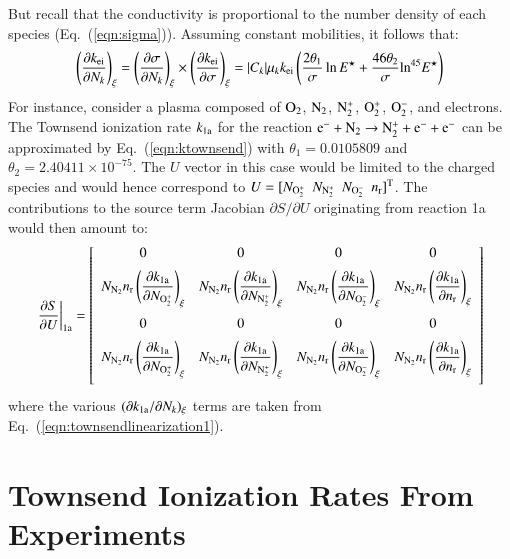 \documentclass{warpdoc}
\newcommand{\alb}{\vspace{0.2cm}\\} %
\newcommand{\nr}{{{n}_{\rm r}}}
\newcommand{\mfd}{\displaystyle}
\begin{document}
%
But recall that the conductivity is proportional to the number density of each species (Eq.\ (\ref{eqn:sigma})). Assuming constant mobilities, it follows that:
%
\begin{equation}
 \left(\frac{\partial k_{\rm ei}}{\partial N_k}\right)_\xi=\left(\frac{\partial \sigma}{\partial N_k}\right)_\xi \times \left(\frac{\partial k_{\rm ei}}{\partial \sigma}\right)_\xi = |C_k| \mu_k k_{\rm ei} \left(\frac{2\theta_1}{\sigma}\ln E^\star + \frac{46 \theta_2}{\sigma} {\rm ln}^{45}E^\star \right) 
\label{eqn:townsendlinearization1}
\end{equation}
%
For instance, consider a plasma composed of $\rm O_2$, $\rm N_2$, $\rm N_2^+$, $\rm O_2^+$, $\rm O_2^-$, and electrons. The Townsend ionization rate $k_{\rm 1a}$ for the reaction $\rm e^-+N_2 \rightarrow N_2^++e^-+e^-$ can be approximated by Eq.\ (\ref{eqn:ktownsend}) with $\theta_1=0.0105809$ and $\theta_2=2.40411\times 10^{-75}$. The $U$ vector in this case would be limited to the charged species and would hence correspond to $U=[N_{\rm O_2^+}~~N_{\rm N_2^+}~~N_{\rm O_2^-}~~\nr]^{\rm T}$. The contributions to the source term Jacobian $\partial S / \partial U$ originating from reaction 1a would then amount to:
%
\begin{equation}
\left.\frac{\partial S}{\partial U}\right|_{\rm 1a}=
\left[\begin{array}{cccc}
0 & 0 & 0 &0 \alb
 \mfd N_{\rm N_2} \nr \left(\frac{\partial k_{\rm 1a}}{\partial N_{\rm O_2^+}}\right)_\xi 
  & \mfd N_{\rm N_2} \nr \left(\frac{\partial k_{\rm 1a}}{\partial N_{\rm N_2^+}}\right)_\xi
  & \mfd N_{\rm N_2} \nr \left(\frac{\partial k_{\rm 1a}}{\partial N_{\rm O_2^-}}\right)_\xi 
  & \mfd N_{\rm N_2} \nr \left(\frac{\partial k_{\rm 1a}}{\partial \nr}\right)_\xi \alb
0 & 0 & 0 &0 \alb
 \mfd N_{\rm N_2} \nr \left(\frac{\partial k_{\rm 1a}}{\partial N_{\rm O_2^+}}\right)_\xi 
  & \mfd N_{\rm N_2} \nr \left(\frac{\partial k_{\rm 1a}}{\partial N_{\rm N_2^+}}\right)_\xi
  & \mfd N_{\rm N_2} \nr \left(\frac{\partial k_{\rm 1a}}{\partial N_{\rm O_2^-}}\right)_\xi 
  & \mfd N_{\rm N_2} \nr \left(\frac{\partial k_{\rm 1a}}{\partial \nr}\right)_\xi \alb
\end{array}\right]
\label{eqn:townsendlinearization}
\end{equation}
% 
where the various $(\partial k_{\rm 1a}/\partial N_k)_\xi$ terms are taken from Eq.\ (\ref{eqn:townsendlinearization1}). 

\section{Townsend Ionization Rates From Experiments}
\end{document}
